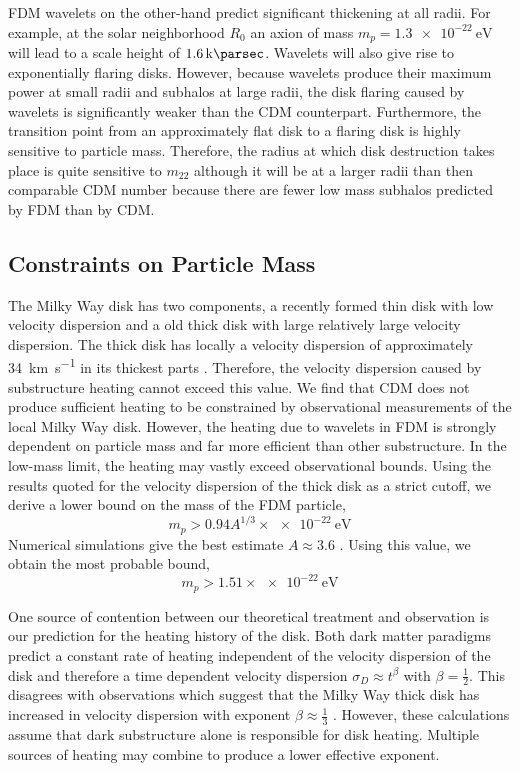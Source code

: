 \documentclass[usenatbib]{mnras}
\begin{document}
\par
	FDM wavelets on the other-hand predict significant thickening at all radii. For example, at the solar neighborhood $R_0$ an axion of mass $m_p = \SI{1.3 e-22}{\electronvolt}$ will lead to a scale height of $\SI{1.6}{ \kilo\parsec}$. Wavelets will also give rise to exponentially flaring disks. However, because wavelets produce their maximum power at small radii and subhalos at large radii, the disk flaring caused by wavelets is significantly weaker than the CDM counterpart. Furthermore, the transition point from an approximately flat disk to a flaring disk is highly sensitive to particle mass. Therefore, the radius at which disk destruction takes place is quite sensitive to $m_{22}$ although it will be at a larger radii than then comparable CDM number because there are fewer low mass subhalos predicted by FDM than by CDM. 


\subsection{Constraints on Particle Mass}

	The Milky Way disk has two components, a recently formed thin disk with low velocity dispersion and a old thick disk with large relatively large velocity dispersion. The thick disk has locally a velocity dispersion of approximately \SI{34}{\kilo\meter\per\second} in its thickest parts \citep{milky_way}. Therefore, the velocity dispersion caused by substructure heating cannot exceed this value. We find that CDM does not produce sufficient heating to be constrained by observational measurements of the local  Milky Way disk. However, the heating due to wavelets in FDM is strongly dependent on particle mass and far more efficient than other substructure. In the low-mass limit, the heating may vastly exceed observational bounds. Using the results quoted for the velocity dispersion of the thick disk as a strict cutoff, we derive a lower bound on the mass of the FDM particle,
\begin{equation}
m_p > 0.94 A^{1/3} \times \SI{e-22}{\electronvolt}
\end{equation}
Numerical simulations give the best estimate $A \approx 3.6$ \citep{BECDM}. Using this value, we obtain the most probable bound,
\[ m_p > 1.51 \times \SI{e-22}{\electronvolt} \]


\par
One source of contention between our theoretical treatment and observation is our prediction for the heating history of the disk. Both dark matter paradigms predict a constant rate of heating independent of the velocity dispersion of the disk and therefore a time dependent velocity dispersion $\sigma_D \approx t^{\beta}$ with $\beta = \tfrac{1}{2}$. This disagrees with observations which suggest that the Milky Way thick disk has increased in velocity dispersion with exponent $\beta \approx \tfrac{1}{3}$ \citep{heating_history}. However, these calculations assume that dark substructure alone is responsible for disk heating. Multiple sources of heating may combine to produce a lower effective exponent. 
\end{document}
